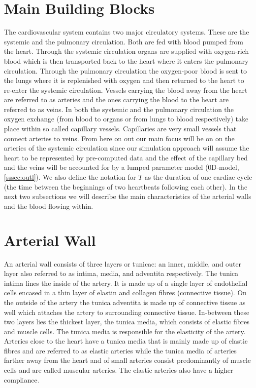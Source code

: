 \documentclass[a4paper, oneside]{discothesis}
\begin{document}
\section{Main Building Blocks} \label{sec:mbb}
The cardiovascular system contains two major circulatory systems.
These are the systemic and the pulmonary circulation. 
Both are fed with blood pumped from the heart.
Through the systemic circulation organs are supplied with oxygen-rich blood which is then transported back to the heart where it enters the pulmonary circulation.
Through the pulmonary circulation the oxygen-poor blood is sent to the lungs where it is replenished with oxygen and then returned to the heart to re-enter the systemic circulation.
Vessels carrying the blood away from the heart are referred to as arteries and the ones carrying the blood to the heart are referred to as veins.
In both the systemic and the pulmonary circulation the oxygen exchange (from blood to organs or from lungs to blood respectively) take place within so called capillary vessels.
Capillaries are very small vessels that connect arteries to veins. \cite{köppl2023dimension}
From here on out our main focus will be on on the arteries of the systemic circulation since our simulation approach will assume the heart to be represented by pre-computed data and the effect of the capillary bed and the veins will be accounted for by a lumped parameter model (0D-model, \autoref{sssec:outl}).
We also define the notation for $T$ as the duration of one cardiac cycle (the time between the beginnings of two heartbeats following each other).
In the next two subsections we will describe the main characteristics of the arterial walls and the blood flowing within.

\section{Arterial Wall} \label{sec:aw}
An arterial wall consists of three layers or tunicae: an inner, middle, and outer layer also referred to as intima, media, and adventita respectively.
The tunica intima lines the inside of the artery. It is made up of a single layer of endothelial cells encased in a thin layer of elastin and collagen fibres (connective tissue). 
On the outside of the artery the tunica adventita is made up of connective tissue as well which attaches the artery to surrounding connective tissue.
In-between these two layers lies the thickest layer, the tunica media, which consists of elastic fibres and muscle cells. 
The tunica media is responsible for the elasticity of the artery.
Arteries close to the heart have a tunica media that is mainly made up of elastic fibres and are referred to as elastic arteries while the tunica media of arteries farther away from the heart and of small arteries consist predominantly of muscle cells and are called muscular arteries.
The elastic arteries also have a higher compliance.
\end{document}

